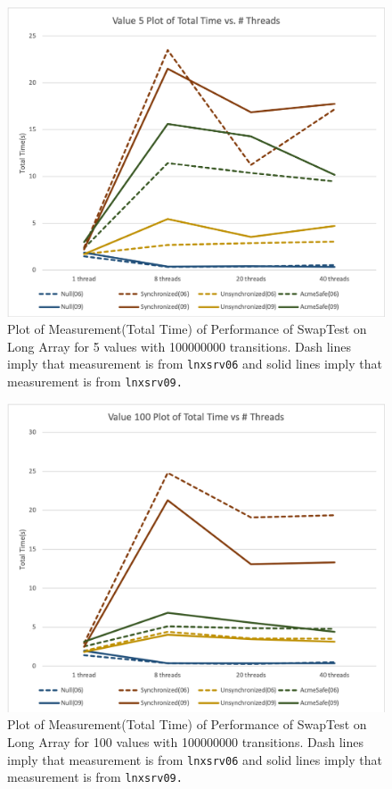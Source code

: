 \begin{figure}
\includegraphics[scale=0.45]{totaltime-value5.png}
\caption{\label{fig:vectors} Plot of Measurement(Total Time) of Performance of SwapTest on Long Array for 5 values with 100000000 transitions. Dash lines imply that measurement is from \texttt{lnxsrv06} and solid lines imply that measurement is from \texttt{lnxsrv09.} }
\end{figure}
\begin{figure}
\includegraphics[scale=0.45]{totaltime-value100.png}
\caption{\label{fig:vectors} Plot of Measurement(Total Time) of Performance of SwapTest on Long Array for 100 values with 100000000 transitions. Dash lines imply that measurement is from \texttt{lnxsrv06} and solid lines imply that measurement is from \texttt{lnxsrv09.} }
\end{figure}
